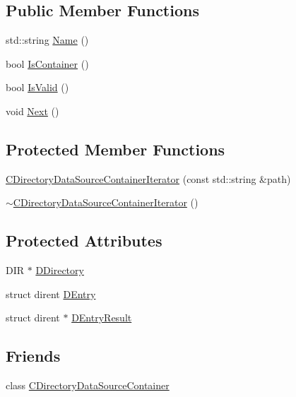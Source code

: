 \subsection*{Public Member Functions}
\begin{DoxyCompactItemize}
\item 
std\+::string \hyperlink{classCDirectoryDataSourceContainerIterator_a24631e9ef36d3cb075e42d38912049ec}{Name} ()
\item 
bool \hyperlink{classCDirectoryDataSourceContainerIterator_a5430df3036bfd75734ffb807b888b208}{Is\+Container} ()
\item 
bool \hyperlink{classCDirectoryDataSourceContainerIterator_ab89d8af808bff115ac7c096bbec23188}{Is\+Valid} ()
\item 
void \hyperlink{classCDirectoryDataSourceContainerIterator_a2b58c5a78c5820e39cd2d9a61724a55e}{Next} ()
\end{DoxyCompactItemize}
\subsection*{Protected Member Functions}
\begin{DoxyCompactItemize}
\item 
\hyperlink{classCDirectoryDataSourceContainerIterator_a34b3253df5cc88a08b8f3f51f7fe9768}{C\+Directory\+Data\+Source\+Container\+Iterator} (const std\+::string \&path)
\item 
\hyperlink{classCDirectoryDataSourceContainerIterator_a451c618483bc9809f53606fea47a52a8}{$\sim$\+C\+Directory\+Data\+Source\+Container\+Iterator} ()
\end{DoxyCompactItemize}
\subsection*{Protected Attributes}
\begin{DoxyCompactItemize}
\item 
D\+IR $\ast$ \hyperlink{classCDirectoryDataSourceContainerIterator_a0e07044b1a916e3dd931ae0778317e16}{D\+Directory}
\item 
struct dirent \hyperlink{classCDirectoryDataSourceContainerIterator_a69dfb8a9f2ab7f71e7d106d4d6c0e29b}{D\+Entry}
\item 
struct dirent $\ast$ \hyperlink{classCDirectoryDataSourceContainerIterator_a7e8c1c50ef09013ee6013dcbd1bdc616}{D\+Entry\+Result}
\end{DoxyCompactItemize}
\subsection*{Friends}
\begin{DoxyCompactItemize}
\item 
class \hyperlink{classCDirectoryDataSourceContainerIterator_ab421e385625629f6c45d70648a928574}{C\+Directory\+Data\+Source\+Container}
\end{DoxyCompactItemize}


